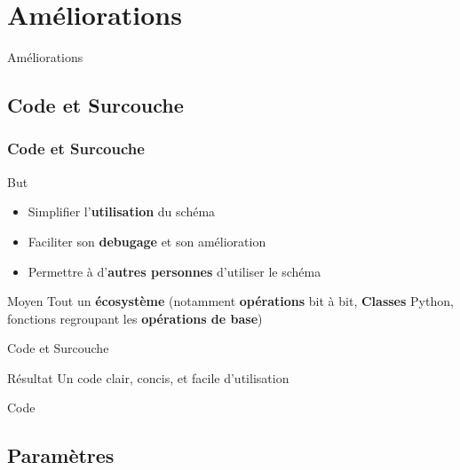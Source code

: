 \section{Améliorations}

\begin{frame}{Améliorations}
    
\end{frame}{}

\subsection{Code et Surcouche}

\begin{frame}
\frametitle{Code et Surcouche}
\begin{alertblock}{But}
\begin{itemize}
    \item Simplifier l'\textbf{utilisation} du schéma
    \item Faciliter son \textbf{debugage} et son amélioration
    \item Permettre à d'\textbf{autres personnes} d'utiliser le schéma 
\end{itemize}{}
\end{alertblock}
\begin{alertblock}{Moyen}
    Tout un \textbf{écosystème} (notamment \textbf{opérations} bit à bit, \textbf{Classes} Python, fonctions regroupant les \textbf{opérations de base})
\end{alertblock}{}
\end{frame}

\begin{frame}{Code et Surcouche}
\begin{alertblock}{Résultat}
Un code clair, concis, et facile d'utilisation
\end{alertblock}{}

\begin{alertblock}{Code}
    
\end{alertblock}{} 
 
\end{frame}{}

\subsection{Paramètres}

